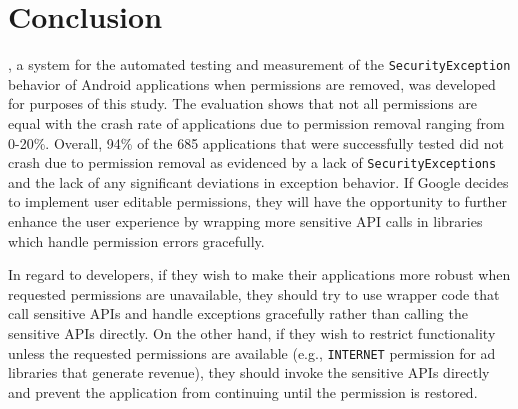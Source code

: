 \chapter{Conclusion}
\label{sec:conclusion}

\toolname, a system for the automated testing and measurement of the \texttt{SecurityException} behavior of Android applications when permissions are removed, was developed for purposes of this study.  The evaluation shows that not all permissions are equal with the crash rate of applications due to permission removal ranging from 0-20\%. Overall, 94\% of the 685 applications that were successfully tested did not crash due to permission removal as evidenced by a lack of \texttt{SecurityExceptions} and the lack of any significant deviations in exception behavior.  If Google decides to implement user editable permissions, they will have the opportunity to further enhance the user experience by wrapping more sensitive API calls in libraries which handle permission errors gracefully. 

In regard to developers, if they wish to make their applications more robust when requested permissions are unavailable, they should try to use wrapper code that call sensitive APIs and handle exceptions gracefully rather than calling the sensitive APIs directly.  On the other hand, if they wish to restrict functionality unless the requested permissions are available (e.g., \texttt{INTERNET} permission for ad libraries that generate revenue), they should invoke the sensitive APIs directly and prevent the application from continuing until the permission is restored.
